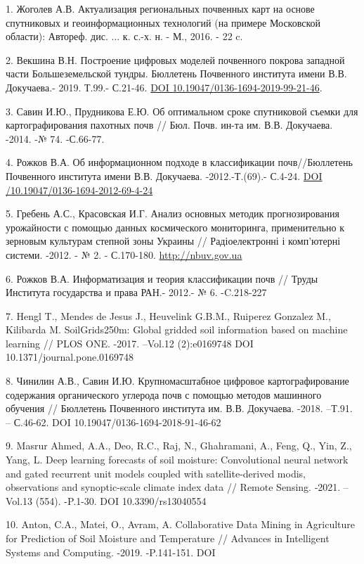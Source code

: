 \begin{references}
1. Жоголев А.В. Актуализация региональных почвенных карт на основе
спутниковых и геоинформационных технологий (на примере Московской
области): Автореф. дис. ... к. с.-х. н. - М., 2016. - 22 c.

2. Векшина В.Н. Построение цифровых моделей почвенного покрова западной
части Большеземельской тундры. Бюллетень Почвенного института имени
В.В. Докучаева.- 2019. Т.99.- С.21-46.
\href{https://doi.org/10.19047/0136-1694-2019-99-21-46}{DOI
10.19047/0136-1694-2019-99-21-46}.

3. Савин И.Ю., Прудникова Е.Ю. Об оптимальном сроке спутниковой съемки
для картографирования пахотных почв // Бюл. Почв. ин-та им. В.В.
Докучаева. -2014. -№ 74. -С.66-77.

4. Рожков В.А. Об информационном подходе в классификации почв//Бюллетень
Почвенного института имени В.В. Докучаева. -2012.-Т.(69).- С.4-24.
\href{https://doi.org/10.19047/0136-1694-2012-69-4-24}{DOI
/10.19047/0136-1694-2012-69-4-24}

5. Гребень А.С., Красовская И.Г. Анализ основных методик прогнозирования
урожайности с помощью данных космического мониторинга, применительно к
зерновым культурам степной зоны Украины // Радіоелектронні і
комп'ютерні системи. -2012. - № 2. - С.170-180.
\href{http://www.irbis-nbuv.gov.ua/cgi-bin/irbis_nbuv/cgiirbis_64.exe?I21DBN=LINK&P21DBN=UJRN&Z21ID=&S21REF=10&S21CNR=20&S21STN=1&S21FMT=ASP_meta&C21COM=S&2_S21P03=FILA=&2_S21STR=recs_2012_2_27}{http://nbuv.gov.ua}

6. Рожков В.А. Информатизация и теория классификации почв // Труды
Института государства и права РАН.- 2012.- № 6. -C.218-227

7. Hengl T., Mendes de Jesus J., Heuvelink G.B.M., Ruiperez Gonzalez M.,
Kilibarda M. SoilGrids250m: Global gridded soil information based on
machine learning // PLOS ONE. -2017. --Vol.12 (2):e0169748 DOI
10.1371/journal.pone.0169748

8. Чинилин А.В., Савин И.Ю. Крупномасштабное цифровое картографирование
содержания органического углерода почв с помощью методов машинного
обучения // Бюллетень Почвенного института им. В.В. Докучаева. -2018.
--Т.91. -- С.46-62. DOI 10.19047/0136-1694-2018-91-46-62

9. Masrur Ahmed, A.A., Deo, R.C., Raj, N., Ghahramani, A., Feng, Q., Yin,
Z., Yang, L. Deep learning forecasts of soil moisture: Convolutional
neural network and gated recurrent unit models coupled with
satellite-derived modis, observations and synoptic-scale climate index
data // Remote Sensing. -2021. --Vol.13 (554). -P.1-30. DOI
10.3390/rs13040554

10. Anton, C.A., Matei, O., Avram, A. Collaborative Data Mining in
Agriculture for Prediction of Soil Moisture and Temperature // Advances
in Intelligent Systems and Computing. -2019. -P.141-151. DOI
\end{references}

